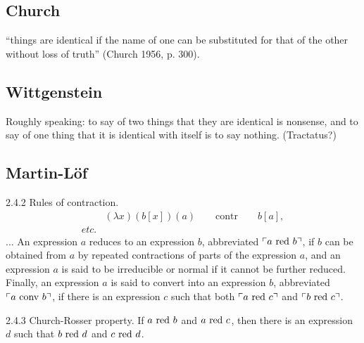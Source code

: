 \documentclass{article}
\begin{document}
\subsection{Church}

“things are identical if the name of one can be substituted for
that of the other without loss of truth” (Church 1956, p. 300).

\subsection{Wittgenstein}

Roughly speaking: to say of two things that they are identical is
nonsense, and to say of one thing that it is identical with itself is
to say nothing. (Tractatus?)

\subsection{Martin-Löf}

\begin{displayquote}
  2.4.2 Rules of contraction.
  \begin{align*}
    & (\lambda x)(b[x])(a)\hspace{2em}\text{contr}\hspace{2em} b[a], \\
    etc.
  \end{align*}
  ... An expression \(a\) {\upshape reduces} to an expression \(b\),
  abbreviated \(\ulcorner a\ \text{\upshape red}\ b\urcorner\), if
  \(b\) can be obtained from \(a\) by repeated contractions of parts
  of the expression \(a\), and an expression \(a\) is said to be
  {\upshape irreducible} or {\upshape normal} if it cannot be further
  reduced. Finally, an expression \(a\) is said to {\upshape convert}
  into an expression \(b\), abbreviated \(\ulcorner a\ \text{\upshape
    conv}\ b\urcorner\), if there is an expression \(c\) such that
  both \(\ulcorner a\ \text{\upshape red}\ c\urcorner\) and \(\ulcorner
  b\ \text{\upshape red}\ c\urcorner\).
\end{displayquote}

\vspace{2ex}

\begin{displayquote}
    2.4.3  Church-Rosser property.  If \(a\ \text{\upshape red}\ b\) and \(a\ \text{\upshape red}\ c\), then there is an expression \(d\) such that
    \(b\ \text{\upshape red}\ d\) and \(c\ \text{\upshape red}\ d\).
\end{displayquote}
\end{document}
